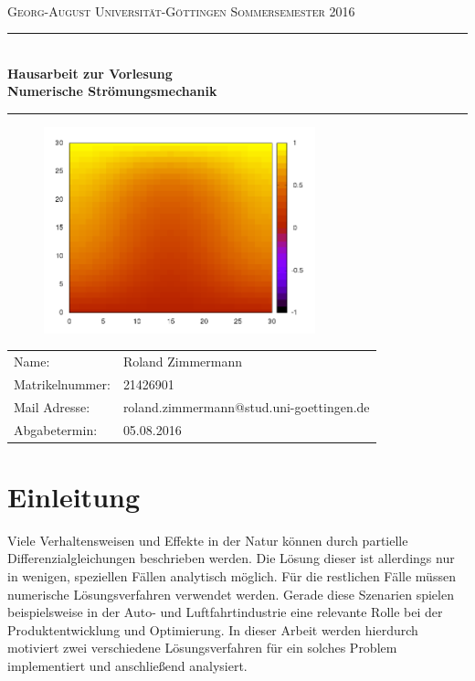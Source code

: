 \documentclass[12pt,a4paper,titlepage,headinclude,bibtotoc]{scrartcl}
\begin{document}
\begin{titlepage}
\centering
\textsc{\Large \\
[1.5ex]Georg-August Universität-Göttingen Sommersemester 2016}

\vspace*{2.2cm}

\rule{\textwidth}{1pt}\\[0.5cm]
{\large \bfseries
  Hausarbeit zur Vorlesung\\[1.5ex]
  \huge Numerische Strömungsmechanik}
\rule{\textwidth}{1pt}

\vspace*{1.0cm}

\begin{figure}[H]  
	\centering
   \includegraphics[width=0.7\textwidth]{res/title/2_05.png}
\end{figure}

\begin{Large}
\begin{tabular}{ll}
Name: & Roland Zimmermann\\
Matrikelnummer:	& 21426901 \\
Mail Adresse: & roland.zimmermann@stud.uni-goettingen.de \\ 
Abgabetermin: & 05.08.2016\\
\end{tabular}
\end{Large}

\end{titlepage}



\tableofcontents

\newpage

\section{Einleitung}
\label{sec:einleitung}
Viele Verhaltensweisen und Effekte in der Natur können durch partielle Differenzialgleichungen beschrieben werden. Die Lösung dieser ist allerdings nur in wenigen, speziellen Fällen analytisch möglich. Für die restlichen Fälle müssen numerische Lösungsverfahren verwendet werden. Gerade diese Szenarien spielen beispielsweise in der Auto- und Luftfahrtindustrie eine relevante Rolle bei der Produktentwicklung und Optimierung. In dieser Arbeit werden hierdurch motiviert zwei verschiedene Lösungsverfahren für ein solches Problem implementiert und anschließend analysiert.
\end{document}
